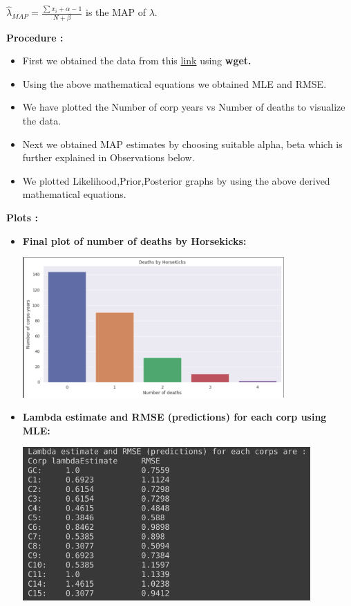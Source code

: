 \documentclass[english,a4paper,12pt]{article}
\begin{document}
\begin{enumerate}
\begin{itemize}
 $\hat{\lambda}_{MAP}=\frac{\sum x_{i}+\alpha - 1}{N+\beta}$ is the $\mathrm{MAP}$ of $\lambda$.\\

 \end{itemize}
 \textbullet \textbf{Procedure :}
 \begin{itemize}
     \item First we obtained the data from this \href{http://www.randomservices.org/random/data/HorseKicks.txt}{link} using \textbf{wget.}
     \item Using the above mathematical equations we obtained MLE and RMSE.
     \item We have plotted the Number of corp years vs Number of deaths to visualize the data.
     \item Next we obtained MAP estimates by choosing suitable alpha, beta which is further explained in Observations below.
     \item We plotted Likelihood,Prior,Posterior graphs by using the above derived mathematical equations.
 \end{itemize}
 \newpage
 \textbullet \textbf{Plots :}
 \begin{itemize}
     \item \textbf{Final plot of number of deaths by Horsekicks:}
     
     \includegraphics[width=10cm]{pictures/Q3/Observations_Q3_2.png}
     
     \item \textbf{Lambda estimate and RMSE (predictions) for each corp using MLE:}
     
    \includegraphics[width=11cm]{pictures/Q3/Observations_Q3_1.png}
     

\end{itemize}
\end{enumerate}
\end{document}
